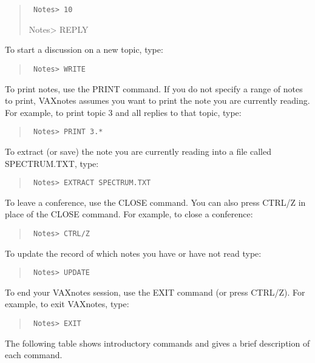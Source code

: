 \begin{quote}\tt
     Notes> 10

     Notes> REPLY
\end{quote}

To start a discussion on a new topic, type:

\begin{quote}\tt
Notes> WRITE
\end{quote}

To print notes, use the PRINT command.  If you do not specify a range of
notes to print, VAXnotes assumes you want to print the note you are
currently reading.  For example, to print topic 3 and all replies to that
topic, type:

\begin{quote}\tt
Notes> PRINT 3.*
\end{quote}

To extract (or save) the note you are currently reading 
into a file called SPECTRUM.TXT, type:

\begin{quote}\tt
Notes> EXTRACT SPECTRUM.TXT
\end{quote}

To leave a conference, use the CLOSE command.  You can also press CTRL/Z
in place of the CLOSE command.  For example, to close a conference:

\begin{quote}\tt
Notes> CTRL/Z
\end{quote}

To update the record of which notes you have or have not read type:

\begin{quote}\tt
Notes> UPDATE
\end {quote}

To end your VAXnotes session, use the EXIT command (or press CTRL/Z).
For example, to exit VAXnotes, type:

\begin{quote}\tt
Notes> EXIT
\end{quote}

The following table shows introductory commands and gives a brief
description of each command.  


